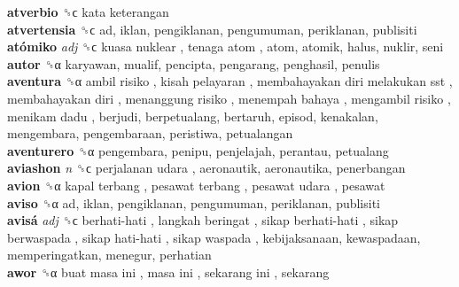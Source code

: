 \textbf{atverbio} ␝ϲ   kata keterangan   \\
\textbf{atvertensia} ␝ϲ  ad, iklan, pengiklanan, pengumuman, periklanan, publisiti  \\
\textbf{atómiko} \emph{adj}  ␝ϲ   kuasa nuklear ,  tenaga atom , atom, atomik, halus, nuklir, seni  \\
\textbf{autor} ␝α  karyawan, mualif, pencipta, pengarang, penghasil, penulis  \\
\textbf{aventura} ␝α   ambil risiko ,  kisah pelayaran ,  membahayakan diri melakukan sst ,  membahayakan diri ,  menanggung risiko ,  menempah bahaya ,  mengambil risiko ,  menikam dadu , berjudi, berpetualang, bertaruh, episod, kenakalan, mengembara, pengembaraan, peristiwa, petualangan  \\
\textbf{aventurero} ␝α  pengembara, penipu, penjelajah, perantau, petualang  \\
\textbf{aviashon} \emph{n}  ␝ϲ   perjalanan udara , aeronautik, aeronautika, penerbangan  \\
\textbf{avion} ␝α   kapal terbang ,  pesawat terbang ,  pesawat udara , pesawat  \\
\textbf{aviso} ␝α  ad, iklan, pengiklanan, pengumuman, periklanan, publisiti  \\
\textbf{avisá} \emph{adj}  ␝ϲ   berhati-hati ,  langkah beringat ,  sikap berhati-hati ,  sikap berwaspada ,  sikap hati-hati ,  sikap waspada , kebijaksanaan, kewaspadaan, memperingatkan, menegur, perhatian  \\
\textbf{awor} ␝α   buat masa ini ,  masa ini ,  sekarang ini , sekarang  \\
